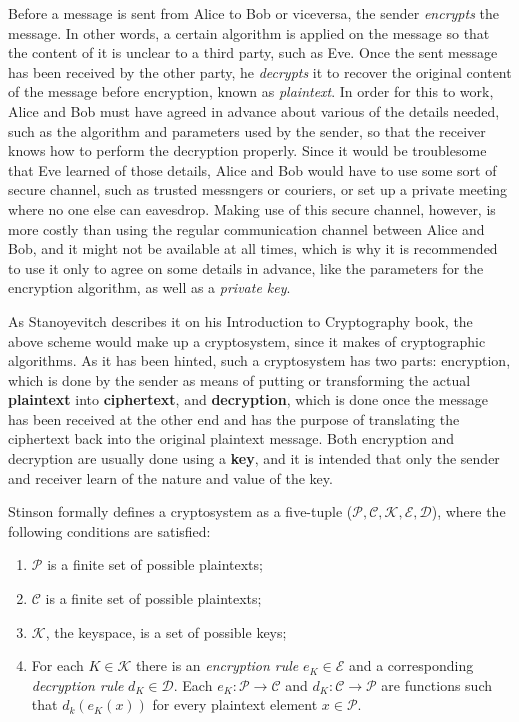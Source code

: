 Before a message is sent from Alice to Bob or viceversa, the sender \textit{encrypts} the message. In other words, a certain algorithm is applied on the message so that the content of it is unclear to a third party, such as Eve. Once the sent message has been received by the other party, he \textit{decrypts} it to recover the original content of the message before encryption, known as \textit{plaintext}. In order for this to work, Alice and Bob must have agreed in advance about various of the details needed, such as the algorithm and parameters used by the sender, so that the receiver knows how to perform the decryption properly. Since it would be troublesome that Eve learned of those details, Alice and Bob would have to use some sort of secure channel, such as trusted messngers or couriers, or set up a private meeting where no one else can eavesdrop. Making use of this secure channel, however, is more costly than using the regular communication channel between Alice and Bob, and it might not be available at all times, which is why it is recommended to use it only to agree on some details in advance, like the parameters for the encryption algorithm, as well as a \textit{private key}.

As Stanoyevitch \cite{IntroCryptoMath} describes it on his Introduction to Cryptography book, the above scheme would make up a cryptosystem, since it makes of cryptographic algorithms. As it has been hinted, such a cryptosystem has two parts: encryption, which is done by the sender as means of putting or transforming the actual \textbf{plaintext} into \textbf{ciphertext}, and \textbf{decryption}, which is done once the message has been received at the other end and has the purpose of translating the ciphertext back into the original plaintext message. Both encryption and decryption are usually done using a \textbf{key}, and it is intended that only the sender and receiver learn of the nature and value of the key. 

Stinson \cite{stinson2005cryptography} formally defines a cryptosystem as a five-tuple ($\mathcal{P}, \mathcal{C}, \mathcal{K}, \mathcal{E}, \mathcal{D}$), where the following conditions are satisfied:
\begin{enumerate}
\item $\mathcal{P}$ is a finite set of possible plaintexts;
\item $\mathcal{C}$ is a finite set of possible plaintexts;
\item $\mathcal{K}$, the keyspace, is a set of possible keys;
\item For each $K \in \mathcal{K}$ there is an \textit{encryption rule} $ e_{K} \in \mathcal{E}$  and a corresponding \textit{decryption rule} $ d_{K} \in \mathcal{D}$. Each $e_{K}: \mathcal{P} \rightarrow \mathcal{C}$ and $d_{K}: \mathcal{C} \rightarrow \mathcal{P}$ are functions such that $d_{k}(e_{K}(x))$ for every plaintext element $x \in \mathcal{P}$.
\end{enumerate}

